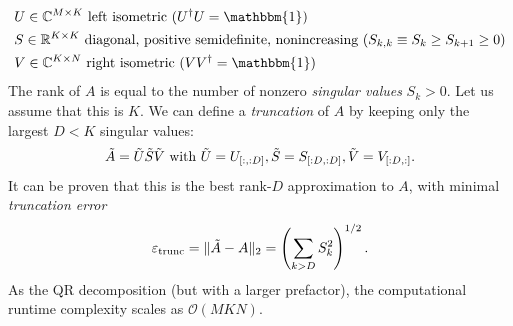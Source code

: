 \noindent {} \vspace{-0.75em} 
\begin{align}
\begin{split}
	& U \in \mathbb{C}^{M \times K} \text{ left isometric } (U^{\dagger}U = \mathbbm{1}) \\
	& S \in \mathbb{R}^{K \times K} \text{ diagonal, positive semidefinite, nonincreasing }  (S_{k,k} \equiv S_k \geq S_{k+1} \geq 0) \\
	& V \in \mathbb{C}^{K \times N} \text{ right isometric } (VV^{\dagger} = \mathbbm{1}) \\
\end{split}
\end{align}
The rank of $A$ is equal to the number of nonzero \textit{singular values} $S_k > 0$. Let us assume that this is $K$. We can define a \textit{truncation} of $A$ by keeping only the largest $D < K$ singular values:
\begin{equation}
	\Tilde{A} = \Tilde{U}\Tilde{S}\Tilde{V} \text{ with } \Tilde{U} = U_{[:, :D]}, \Tilde{S} = S_{[:D, :D]}, \Tilde{V} = V_{[:D, :]}.
\end{equation}
It can be proven that this is the best rank-$D$ approximation to $A$, with minimal \textit{truncation error}
\begin{equation}
	\varepsilon_{\text{trunc}} = \Vert \Tilde{A} - A \Vert_2 = \left( \sum_{k > D} S_k^2 \right)^{1/2}.
\end{equation}
As the QR decomposition (but with a larger prefactor), the computational runtime complexity scales as $\mathcal{O}(MKN)$. \\

